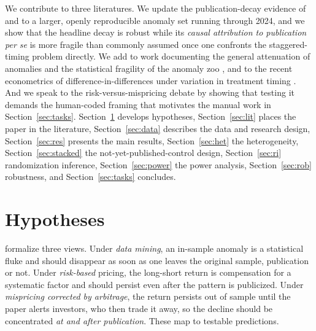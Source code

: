 \documentclass[12pt]{article}
\begin{document}
We contribute to three literatures. We update the publication-decay evidence of
\citet{mcleanpontiff2016} and \citet{jacobsmuller2020} to a larger, openly reproducible
anomaly set running through 2024, and we show that the headline decay is robust while its
\emph{causal attribution to publication per se} is more fragile than commonly assumed once
one confronts the staggered-timing problem directly. We add to work documenting the general
attenuation of anomalies \citep{chordia2014,greenhandzhang2017} and the statistical fragility
of the anomaly zoo \citep{harveyliuzhu2016,houxuezhang2020}, and to the recent econometrics of
difference-in-differences under variation in treatment timing
\citep{goodmanbacon2021,callaway2021,cengiz2019}. And we speak to the risk-versus-mispricing
debate \citep{cochrane2011,shleifervishny1997} by showing that testing it demands the
human-coded framing that motivates the manual work in Section~\ref{sec:tasks}.
Section~\ref{sec:hyp} develops hypotheses, Section~\ref{sec:lit} places the paper in the
literature, Section~\ref{sec:data} describes the data and research design, Section~\ref{sec:res}
presents the main results, Section~\ref{sec:het} the heterogeneity, Section~\ref{sec:stacked}
the not-yet-published-control design, Section~\ref{sec:ri} randomization inference,
Section~\ref{sec:power} the power analysis, Section~\ref{sec:rob} robustness, and
Section~\ref{sec:tasks} concludes.

\section{Hypotheses}\label{sec:hyp}
\citet{mcleanpontiff2016} formalize three views. Under \emph{data mining}, an in-sample
anomaly is a statistical fluke and should disappear as soon as one leaves the original sample,
publication or not. Under \emph{risk-based} pricing, the long-short return is compensation for
a systematic factor and should persist even after the pattern is publicized. Under
\emph{mispricing corrected by arbitrage}, the return persists out of sample until the paper
alerts investors, who then trade it away, so the decline should be concentrated \emph{at and
after publication}. These map to testable predictions.
\end{document}
